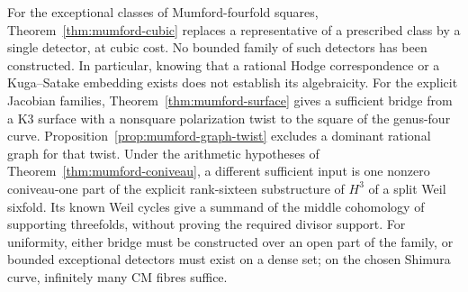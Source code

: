For the exceptional classes of Mumford-fourfold squares, Theorem~\ref{thm:mumford-cubic} replaces a representative of a prescribed class by a single detector, at cubic cost. No bounded family of such detectors has been constructed. In particular, knowing that a rational Hodge correspondence or a Kuga--Satake embedding exists does not establish its algebraicity. For the explicit Jacobian families, Theorem~\ref{thm:mumford-surface} gives a sufficient bridge from a K3 surface with a nonsquare polarization twist to the square of the genus-four curve. Proposition~\ref{prop:mumford-graph-twist} excludes a dominant rational graph for that twist. Under the arithmetic hypotheses of Theorem~\ref{thm:mumford-coniveau}, a different sufficient input is one nonzero coniveau-one part of the explicit rank-sixteen substructure of $H^3$ of a split Weil sixfold. Its known Weil cycles give a summand of the middle cohomology of supporting threefolds, without proving the required divisor support. For uniformity, either bridge must be constructed over an open part of the family, or bounded exceptional detectors must exist on a dense set; on the chosen Shimura curve, infinitely many CM fibres suffice.
